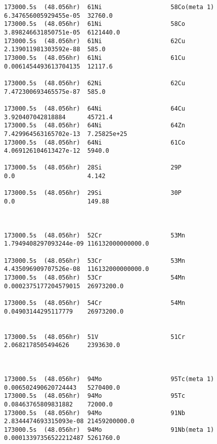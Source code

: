 \begin{lstlisting}[style=sOutputFile,caption={Final results for steel irradiation},label={listing:alexsteel}]
173000.5s  (48.056hr)  61Ni                   58Co(meta 1)           6.347656005929455e-05  32760.0               
173000.5s  (48.056hr)  61Ni                   58Co                   3.898246631850751e-05  6121440.0             
173000.5s  (48.056hr)  61Ni                   62Cu                   2.139011981303592e-88  585.0                 
173000.5s  (48.056hr)  61Ni                   61Cu                   0.0061454493613704135  12117.6               

173000.5s  (48.056hr)  62Ni                   62Cu                   7.472300693465575e-87  585.0                 

173000.5s  (48.056hr)  64Ni                   64Cu                   3.920407042818884      45721.4               
173000.5s  (48.056hr)  64Ni                   64Zn                   7.429964563165702e-13  7.25825e+25           
173000.5s  (48.056hr)  64Ni                   61Co                   4.069126104613427e-12  5940.0                

173000.5s  (48.056hr)  28Si                   29P                    0.0                    4.142                 

173000.5s  (48.056hr)  29Si                   30P                    0.0                    149.88                



173000.5s  (48.056hr)  52Cr                   53Mn                   1.7949408297093244e-09 116132000000000.0     

173000.5s  (48.056hr)  53Cr                   53Mn                   4.435096909707526e-08  116132000000000.0     
173000.5s  (48.056hr)  53Cr                   54Mn                   0.0002375177204579015  26973200.0            

173000.5s  (48.056hr)  54Cr                   54Mn                   0.04903144295117779    26973200.0            


173000.5s  (48.056hr)  51V                    51Cr                   2.0682178505494626     2393630.0             



173000.5s  (48.056hr)  94Mo                   95Tc(meta 1)           0.006502490620724443   5270400.0             
173000.5s  (48.056hr)  94Mo                   95Tc                   0.08463765809831882    72000.0               
173000.5s  (48.056hr)  94Mo                   91Nb                   2.8344474693315093e-08 21459200000.0         
173000.5s  (48.056hr)  94Mo                   91Nb(meta 1)           0.00013397356522212487 5261760.0             


\end{lstlisting}
